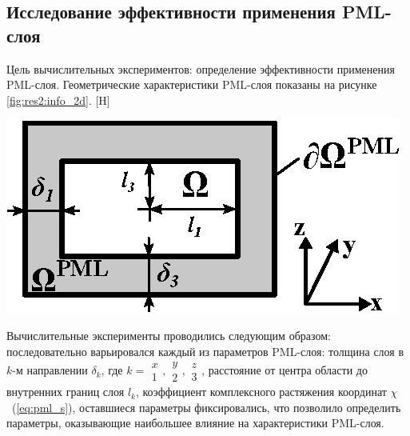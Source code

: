 \documentclass[a4paper,14pt]{article}
\makeatletter
\renewenvironment{figure}[1][\fps@figure]{
  \edef\@tempa{\noexpand\@float{figure}[#1]}
  \@tempa
  \addtocounter{foofigure}{1}
}{
  \end@float
}
\makeatother
\begin{document}
\subsection{Исследование эффективности применения PML-слоя}
Цель вычислительных экспериментов: определение эффективности применения PML-слоя. Геометрические характеристики PML-слоя показаны на рисунке \ref{fig:res2:info_2d}.
\begin{figure}[H]
	\centering
	\includegraphics[scale=1.25]{research-2/info_2d/info_2d_2.eps}
	\caption{геометрические характеристики PML-слоя}
	\label{fig:res2:info_2d}
\end{figure}

Вычислительные эксперименты проводились следующим образом: последовательно варьировался каждый из параметров PML-слоя: толщина слоя в $k$-м направлении $\delta_k$, где $k = \begin{smallmatrix}x\\1\end{smallmatrix},\begin{smallmatrix}y\\2\end{smallmatrix},\begin{smallmatrix}z\\3\end{smallmatrix}$, расстояние от центра области до внутренних границ слоя $l_k$, коэффициент комплексного растяжения координат $\chi$~(\ref{eq:pml_s}), оставшиеся параметры фиксировались, что позволило определить параметры, оказывающие наибольшее влияние на характеристики PML-слоя.
\end{document}
